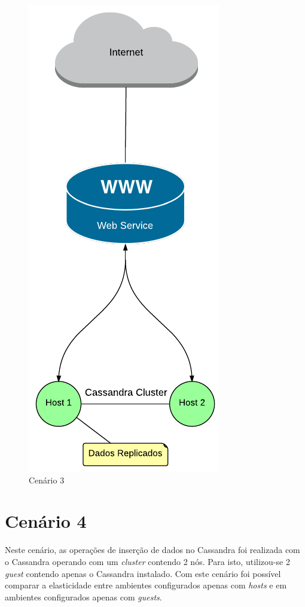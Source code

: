     \begin{figure}[H]
    \centering
    \includegraphics[scale=0.60]{imagens/BD-2Host.pdf}
    \caption{Cenário 3}
    \label{fig:bd2host}
    \end{figure} 
    
    
\section{Cenário 4}
Neste cenário, as operações de inserção de dados no Cassandra foi realizada com o Cassandra operando com um \textit{cluster} contendo 2 nós.
Para isto, utilizou-se 2 \textit{guest} contendo apenas o Cassandra instalado.
Com este cenário foi possível comparar a elasticidade entre ambientes configurados apenas com \textit{hosts} e em ambientes configurados apenas com \textit{guests}.

